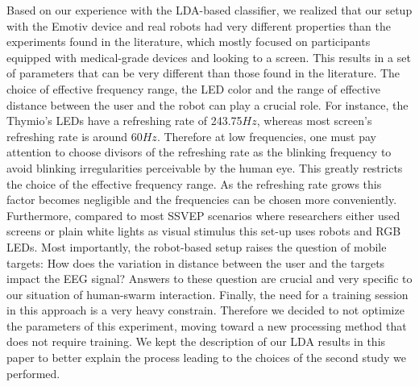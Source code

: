 \documentclass[smallextended]{svjour3}
\begin{document}
Based on our experience with the LDA-based classifier, we realized that our setup with the Emotiv device and real robots had very different properties than the experiments found in the literature, which mostly focused on participants equipped with medical-grade devices and looking to a screen. This results in a set of parameters that can be very different than those found in the literature. 
The choice of effective frequency range, the LED color and the range of effective distance between the user and the robot can play a crucial role. 
For instance, the Thymio's LEDs have a refreshing rate of 243.75$Hz$, whereas most screen's refreshing rate is around 60$Hz$. Therefore at low frequencies, one must pay attention to choose divisors of the refreshing rate as the blinking frequency to avoid blinking irregularities perceivable by the human eye. This greatly restricts the choice of the effective frequency range. As the refreshing rate grows this factor becomes negligible and the frequencies can be chosen more conveniently. Furthermore, compared to most SSVEP scenarios where researchers either used screens or plain white lights as visual stimulus this set-up uses robots and RGB LEDs. Most importantly, the robot-based setup raises the question of mobile targets: How does the variation in distance between the user and the targets impact the EEG signal? Answers to these question are crucial and very specific to our situation of human-swarm interaction.
Finally, the need for a training session in this approach is a very heavy constrain. Therefore we decided to not optimize the parameters of this experiment, moving toward a new processing method that does not require training. We kept the description of our LDA results in this paper to better explain the process leading to the choices of the second study we performed.
\end{document}
